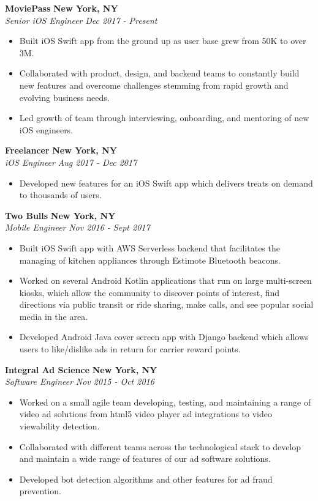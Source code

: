 \documentclass{res}
\begin{document}
\begin{resume}
{\bf MoviePass} \hfill {\bf New York, NY} \\
{\textit {Senior iOS Engineer}} \hfill {\textit {Dec 2017 - Present}} 
\begin{itemize}
\renewcommand{\labelitemi}{\ding{117}}
\itemsep -2pt  
\item Built iOS Swift app from the ground up as user base grew from 50K to over 3M.
\item Collaborated with product, design, and backend teams to constantly build new features and overcome challenges stemming from rapid growth and evolving business needs.
\item Led growth of team through interviewing, onboarding, and mentoring of new iOS engineers. 
\end{itemize}

{\bf Freelancer} \hfill {\bf New York, NY} \\
{\textit {iOS Engineer}} \hfill {\textit {Aug 2017 - Dec 2017}} 
\begin{itemize}
\renewcommand{\labelitemi}{\ding{117}}
\itemsep -2pt  
\item Developed new features for an iOS Swift app which delivers treats on demand to thousands of users.
\end{itemize}

{\bf Two Bulls} \hfill {\bf New York, NY} \\
{\textit {Mobile Engineer}} \hfill {\textit {Nov 2016 - Sept 2017}} 
\begin{itemize}
\renewcommand{\labelitemi}{\ding{117}}
\itemsep -2pt  
\item Built iOS Swift app with AWS Serverless backend that facilitates the managing of kitchen appliances through Estimote Bluetooth beacons. 
\item Worked on several Android Kotlin applications that run on large multi-screen kiosks, which allow the community to discover points of interest, find directions via public transit or ride sharing, make calls, and see popular social media in the area. 
\item Developed Android Java cover screen app with Django backend which allows users to like/dislike ads in return for carrier reward points.

\end{itemize}

{\bf Integral Ad Science} \hfill {\bf New York, NY} \\
{\textit {Software Engineer}} \hfill {\textit {Nov 2015 - Oct 2016}} 
\begin{itemize}
\renewcommand{\labelitemi}{\ding{117}}
\itemsep -2pt  
\item Worked on a small agile team developing, testing, and maintaining a range of video ad solutions from html5 video player ad integrations to video viewability detection.
\item Collaborated with different teams across the technological stack to develop and maintain a wide range of features of our ad software solutions.
\item Developed bot detection algorithms and other features for ad fraud prevention.


\end{itemize}
\end{resume}
\end{document}
